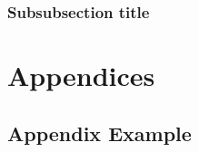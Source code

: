 \documentclass[a4paper]{article}
\begin{document}
\subsubsection{Subsubsection title}



\newpage
\appendix

\section{Appendices}

\newpage
\subsection{Appendix Example}




\newpage
\printbibliography
\end{document}
